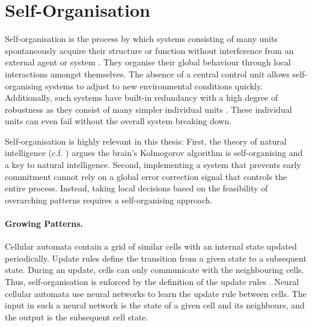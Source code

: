 \section{Self-Organisation}
Self-organisation is the process by which systems consisting of many units spontaneously acquire their structure or function without interference from an external agent or system .
They organise their global behaviour through local interactions amongst themselves.
The absence of a central control unit allows self-organising systems to adjust to new environmental conditions quickly.
Additionally, such systems have built-in redundancy with a high degree of robustness as they consist of many simpler individual units .
These individual units can even fail without the overall system breaking down.

Self-organisation is highly relevant in this thesis: First, the theory of natural intelligence (c.f. ) argues the brain's Kolmogorov algorithm is self-organising and a key to natural intelligence. Second, implementing a system that prevents early commitment cannot rely on a global error correction signal that controls the entire process. Instead, taking local decisions based on the feasibility of overarching patterns requires a self-organising approach.

\paragraph{Growing Patterns.} Cellular automata contain a grid of similar cells with an internal state updated periodically.
Update rules define the transition from a given state to a subsequent state.
During an update, cells can only communicate with the neighbouring cells.
Thus, self-organisation is enforced by the definition of the update rules .
Neural cellular automata  use neural networks to learn the update rule between cells.
The input in such a neural network is the state of a given cell and its neighbours, and the output is the subsequent cell state.

